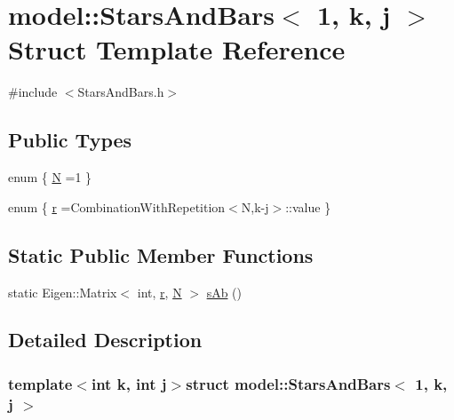 \hypertarget{structmodel_1_1_stars_and_bars_3_011_00_01k_00_01j_01_4}{}\section{model\+:\+:Stars\+And\+Bars$<$ 1, k, j $>$ Struct Template Reference}
\label{structmodel_1_1_stars_and_bars_3_011_00_01k_00_01j_01_4}


{\ttfamily \#include $<$Stars\+And\+Bars.\+h$>$}

\subsection*{Public Types}
\begin{DoxyCompactItemize}
\item 
enum \{ \hyperlink{structmodel_1_1_stars_and_bars_3_011_00_01k_00_01j_01_4_ab65b172c53d062ae2508e6e8e3e78c93a96ab2a5d1014963ea21cd2e00427fbda}{N} =1
 \}
\item 
enum \{ \hyperlink{structmodel_1_1_stars_and_bars_3_011_00_01k_00_01j_01_4_a5383e0f64141d10f22de3e3686ed4981a76bf6e0a4b927e54e8437e0801e9a802}{r} =Combination\+With\+Repetition$<$N,k-\/j$>$\+:\+:value
 \}
\end{DoxyCompactItemize}
\subsection*{Static Public Member Functions}
\begin{DoxyCompactItemize}
\item 
static Eigen\+::\+Matrix$<$ int, \hyperlink{structmodel_1_1_stars_and_bars_3_011_00_01k_00_01j_01_4_a5383e0f64141d10f22de3e3686ed4981a76bf6e0a4b927e54e8437e0801e9a802}{r}, \hyperlink{structmodel_1_1_stars_and_bars_3_011_00_01k_00_01j_01_4_ab65b172c53d062ae2508e6e8e3e78c93a96ab2a5d1014963ea21cd2e00427fbda}{N} $>$ \hyperlink{structmodel_1_1_stars_and_bars_3_011_00_01k_00_01j_01_4_aa5ebd127f12c426dac2e746a19707c24}{s\+Ab} ()
\end{DoxyCompactItemize}


\subsection{Detailed Description}
\subsubsection*{template$<$int k, int j$>$struct model\+::\+Stars\+And\+Bars$<$ 1, k, j $>$}



